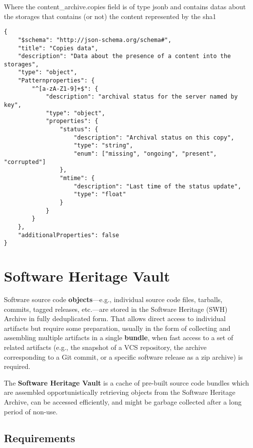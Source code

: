 Where the content\_archive.copies field is of type jsonb and contains
datas about the storages that contains (or not) the content represented
by the sha1

\begin{verbatim}
{
    "$schema": "http://json-schema.org/schema#",
    "title": "Copies data",
    "description": "Data about the presence of a content into the storages",
    "type": "object",
    "Patternproperties": {
        "^[a-zA-Z1-9]+$": {
            "description": "archival status for the server named by key",
            "type": "object",
            "properties": {
                "status": {
                    "description": "Archival status on this copy",
                    "type": "string",
                    "enum": ["missing", "ongoing", "present", "corrupted"]
                },
                "mtime": {
                    "description": "Last time of the status update",
                    "type": "float"
                }
            }
        }
    },
    "additionalProperties": false
}
\end{verbatim}

\section{Software Heritage Vault
\label{annexe-vault}}\label{software-heritage-vault}

Software source code \textbf{objects}---e.g., individual source code
files, tarballs, commits, tagged releases, etc.---are stored in the
Software Heritage (SWH) Archive in fully deduplicated form. That allows
direct access to individual artifacts but require some preparation,
usually in the form of collecting and assembling multiple artifacts in a
single \textbf{bundle}, when fast access to a set of related artifacts
(e.g., the snapshot of a VCS repository, the archive corresponding to a
Git commit, or a specific software release as a zip archive) is
required.

The \textbf{Software Heritage Vault} is a cache of pre-built source code
bundles which are assembled opportunistically retrieving objects from
the Software Heritage Archive, can be accessed efficiently, and might be
garbage collected after a long period of non-use.

\subsection{Requirements}\label{requirements-2}

